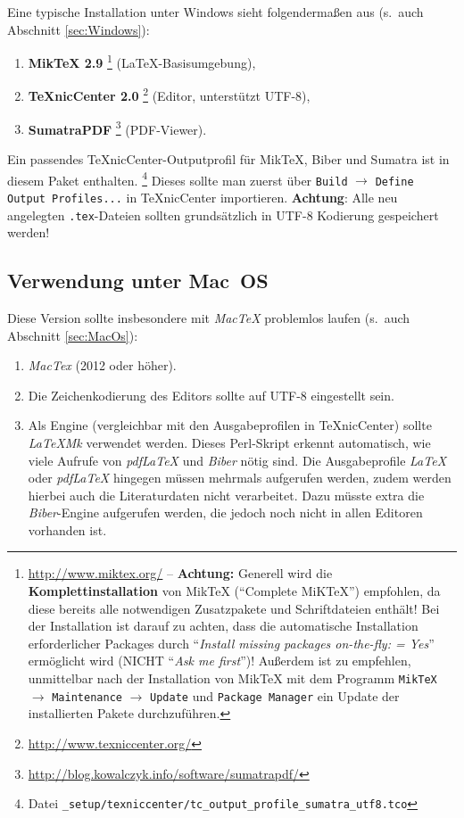 Eine typische Installation unter Windows sieht folgendermaßen aus
(s.\ auch Abschnitt \ref{sec:Windows}):
%
\begin{enumerate}
\item \textbf{MikTeX 2.9}%
	\footnote{\url{http://www.miktex.org/} -- \textbf{Achtung:} 
	Generell wird die \textbf{Komplett\-installation} von MikTeX ("`Complete MiKTeX"') empfohlen, 
	da diese bereits alle notwendigen Zusatzpakete und Schriftdateien enthält! 
	Bei der Installation ist darauf zu achten, 
	dass die automatische Installation erforderlicher Packages 
	durch "`\emph{Install missing packages on-the-fly: = Yes}"' ermöglicht wird (NICHT "`\emph{Ask me first}"')!
	Außerdem ist zu empfehlen, unmittelbar nach der Installation von MikTeX mit dem Programm
	\texttt{MikTeX} $\to$ \texttt{Maintenance} $\to$ \texttt{Update} und \texttt{Package Manager} 
	ein Update der installierten Pakete durchzuführen.}
	(LaTeX-Basisumgebung),
\item \textbf{TeXnicCenter 2.0}%
	\footnote{\url{http://www.texniccenter.org/}}
	(Editor, unterstützt UTF-8),
\item \textbf{SumatraPDF}%
	\footnote{\url{http://blog.kowalczyk.info/software/sumatrapdf/}} 
	(PDF-Viewer).
\end{enumerate}
%
Ein passendes TeXnicCenter-Outputprofil für MikTeX, Biber und Sumatra ist in diesem Paket enthalten.%
\footnote{Datei \nolinkurl{_setup/texniccenter/tc_output_profile_sumatra_utf8.tco}} 
Dieses sollte man zuerst
über \texttt{Build} $\to$ \texttt{Define Output Profiles...} in TeXnicCenter importieren.
\textbf{Achtung}: Alle neu angelegten \texttt{.tex}-Dateien sollten grundsätzlich in UTF-8 Kodierung gespeichert werden!


\subsection{Verwendung unter Mac~OS}

Diese Version sollte insbesondere mit \emph{MacTeX} problemlos laufen (s.\ auch Abschnitt \ref{sec:MacOs}):
\begin{enumerate}
\item 
	\emph{MacTex} (2012 oder höher).
\item 
	Die Zeichenkodierung des Editors sollte auf UTF-8 eingestellt sein.
\item 
	Als Engine (vergleichbar mit den Ausgabeprofilen in TeXnicCenter) sollte \emph{LaTeXMk} verwendet werden. 
	Dieses Perl-Skript erkennt automatisch, wie viele Aufrufe von \emph{pdfLaTeX} und \emph{Biber} nötig sind. 
	Die Ausgabeprofile \emph{LaTeX} oder \emph{pdfLaTeX} hingegen müssen mehrmals aufgerufen werden, 
	zudem werden hierbei auch die Literaturdaten nicht verarbeitet. Dazu müsste extra die \emph{Biber}-Engine 
	aufgerufen werden, 	die jedoch noch nicht in allen Editoren vorhanden ist.
\end{enumerate}
